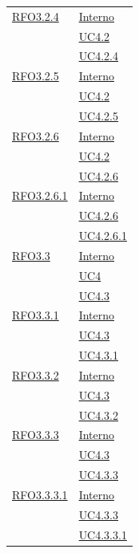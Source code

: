 \begin{longtable}{|>{\centering}m{5cm}|m{5cm}<{\centering}|}
\hyperlink{RFO3.2.4}{RFO3.2.4} & \hyperlink{Interno}{Interno}\\
& \hyperref[UC4.2]{UC4.2}\\
& \hyperref[UC4.2.4]{UC4.2.4}\\ \hline

\hyperlink{RFO3.2.5}{RFO3.2.5} & \hyperlink{Interno}{Interno}\\
& \hyperref[UC4.2]{UC4.2}\\
& \hyperref[UC4.2.5]{UC4.2.5}\\ \hline

\hyperlink{RFO3.2.6}{RFO3.2.6} & \hyperlink{Interno}{Interno}\\
& \hyperref[UC4.2]{UC4.2}\\
& \hyperref[UC4.2.6]{UC4.2.6}\\ \hline

\hyperlink{RFO3.2.6.1}{RFO3.2.6.1} & \hyperlink{Interno}{Interno}\\
& \hyperref[UC4.2.6]{UC4.2.6}\\
& \hyperref[UC4.2.6.1]{UC4.2.6.1}\\ \hline

\hyperlink{RFO3.3}{RFO3.3} & \hyperlink{Interno}{Interno}\\
& \hyperref[UC4]{UC4}\\
& \hyperref[UC4.3]{UC4.3}\\ \hline

\hyperlink{RFO3.3.1}{RFO3.3.1} & \hyperlink{Interno}{Interno}\\
& \hyperref[UC4.3]{UC4.3}\\
& \hyperref[UC4.3.1]{UC4.3.1}\\ \hline

\hyperlink{RFO3.3.2}{RFO3.3.2} & \hyperlink{Interno}{Interno}\\
& \hyperref[UC4.3]{UC4.3}\\
& \hyperref[UC4.3.2]{UC4.3.2}\\ \hline

\hyperlink{RFO3.3.3}{RFO3.3.3} & \hyperlink{Interno}{Interno}\\
& \hyperref[UC4.3]{UC4.3}\\
& \hyperref[UC4.3.3]{UC4.3.3}\\ \hline

\hyperlink{RFO3.3.3.1}{RFO3.3.3.1} & \hyperlink{Interno}{Interno}\\
& \hyperref[UC4.3.3]{UC4.3.3}\\
& \hyperref[UC4.3.3.1]{UC4.3.3.1}\\ \hline


\end{longtable}
